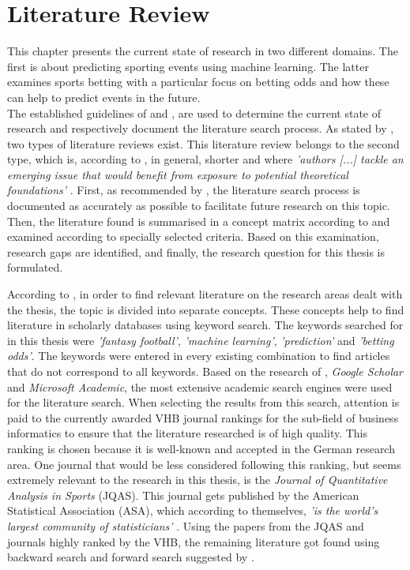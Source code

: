 \chapter{Literature Review}
This chapter presents the current state of research in two different domains. The first is about predicting sporting events using machine learning. The latter examines sports betting with a particular focus on betting odds and how these can help to predict events in the future. \\
\indent The established guidelines of \cite{vom_brocke_standing_2015} and \cite{webster_guest_2002}, are used to determine the current state of research and respectively document the literature search process. As stated by \citeauthor{webster_guest_2002}, two types of literature reviews exist. This literature review belongs to the second type, which is, according to \citeauthor{webster_guest_2002}, in general, shorter and where \emph{'authors [...] tackle an emerging issue that would benefit from exposure to potential theoretical foundations'} \parencite[, p. 14]{webster_guest_2002}. First, as recommended by \cite{vom_brocke_standing_2015}, the literature search process is documented as accurately as possible to facilitate future research on this topic. Then, the literature found is summarised in a concept matrix according to \cite{webster_guest_2002} and examined according to specially selected criteria. Based on this examination, research gaps are identified, and finally, the research question for this thesis is formulated.

According to \cite{vom_brocke_standing_2015}, in order to find relevant literature on the research areas dealt with the thesis, the topic is divided into separate concepts. These concepts help to find literature in scholarly databases using keyword search. The keywords searched for in this thesis were \emph{'fantasy football'}, \emph{'machine learning'}, \emph{'prediction'} and \emph{'betting odds'}. The keywords were entered in every existing combination to find articles that do not correspond to all keywords. Based on the research of \cite{gusenbauer_google_2019}, \emph{Google Scholar} and \emph{Microsoft Academic}, the most extensive academic search engines were used for the literature search. When selecting the results from this search, attention is paid to the currently awarded VHB journal rankings \parencite[see][]{vhb_e_v_vhb-jourqual3_2015} for the sub-field of business informatics to ensure that the literature researched is of high quality. This ranking is chosen because it is well-known and accepted in the German research area. One journal that would be less considered following this ranking, but seems extremely relevant to the research in this thesis, is the \emph{Journal of Quantitative Analysis in Sports} (JQAS). This journal gets published by the American Statistical Association (ASA), which according to themselves, \emph{'is the world's largest community of statisticians'} \parencite[see][]{noauthor_about_nodate}. Using the papers from the JQAS and journals highly ranked by the VHB, the remaining literature got found using backward search and forward search suggested by \citeauthor{webster_guest_2002}.

